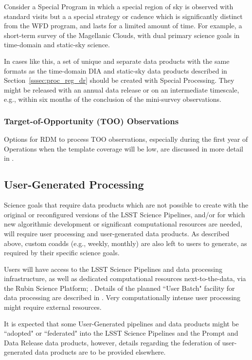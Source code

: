 Consider a Special Program in which a special region of sky is observed with standard
visits but a a special strategy or cadence which is significantly distinct from the WFD program,
and lasts for a limited amount of time.
For example, a short-term survey of the Magellanic Clouds, with dual primary science
goals in time-domain and static-sky science.

In cases like this, a set of unique and separate data products with the same formats as the 
time-domain DIA and static-sky data products described in Section~\ref{sssec:proc_reg_dr}
should be created with Special Processing.
They might be released with an annual data release or on an intermediate timescale, e.g.,
within six months of the conclusion of the mini-survey observations.

\subsubsection{Target-of-Opportunity (TOO) Observations}

Options for RDM to process TOO observations, especially during the first year of Operations 
when the template coverage will be low, are discussed in more detail in 
.

\subsection{User-Generated Processing}\label{ssec:proc_user}

Science goals that require data products which are not possible to create with 
the original or reconfigured versions of the LSST Science Pipelines, 
and/or for which new algorithmic development or significant computational resources 
are needed, will require user processing and user-generated data products.
As described above, custom coadds (e.g., weekly, monthly) are also left to users 
to generate, as required by their specific science goals.

Users will have access to the LSST Science Pipelines and data processing 
infrastructure, as well as dedicated computational resources next-to-the-data, 
via the Rubin Science Platform; .
Details of the planned ``User Batch" facility for data processing are described in 
.
Very computationally intense user processing might require external resources. 

It is expected that some User-Generated pipelines and data products 
might be ``adopted" or ``federated" into the LSST Science Pipelines and the Prompt 
and Data Release data products, however, details regarding the federation of 
user-generated data products are to be provided elsewhere.

